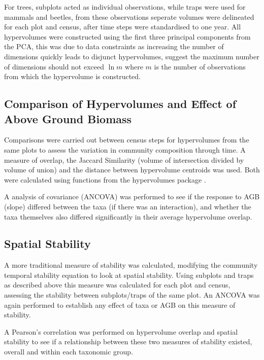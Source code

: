 	For trees, subplots acted as individual observations, while traps were used for mammals and beetles, from these observations seperate volumes were delineated for each plot and census, after time steps were standardised to one year. All hypervolumes were constructed using the first three principal components from the PCA, this was due to data constraints as increasing the number of dimensions quickly leads to disjunct hypervolumes, \cite{Blonder2017b} suggest the maximum number of dimensions should not exceed $\ln m$ where $m$ is the number of observations from which the hypervolume is constructed.

\subsection{Comparison of Hypervolumes and Effect of Above Ground Biomass}

Comparisons were carried out between census steps for hypervolumes from the same plots to assess the variation in community composition through time. A measure of overlap, the Jaccard Similarity (volume of intersection divided by volume of union) and the distance between hypervolume centroids was used. Both were calculated using functions from the hypervolumes package \citep{Blonder2017a}.

A analysis of covariance (ANCOVA) was performed to see if the response to AGB (slope) differed between the taxa (if there was an interaction), and whether the taxa themselves also differed significantly in their average hypervolume overlap.


\subsection{Spatial Stability}
A more traditional measure of stability was calculated, modifying the community temporal stability equation to look at spatial stability. Using subplots and traps as described above this measure was calculated for each plot and census, assessing the stability between subplots/traps of the same plot. An ANCOVA was again performed to  establish any effect of taxa or AGB on this measure of stability. 

A Pearson's correlation was performed on hypervolume overlap and spatial stability to see if a relationship between these two measures of stability existed, overall and within each taxonomic group. 